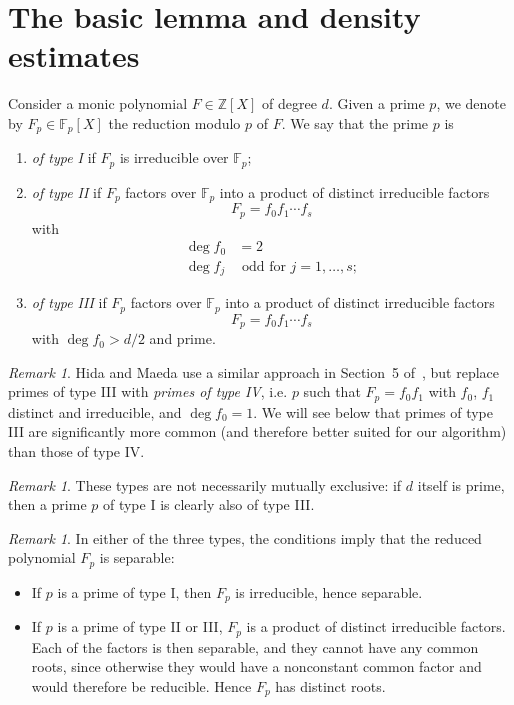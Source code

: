 \documentclass[11pt]{article}
\theoremstyle{plain}
\theoremstyle{definition}
\theoremstyle{remark}
\newtheorem{remark}[theorem]{Remark}
\numberwithin{equation}{section}
\newcommand{\ZZ}{\mathbb{Z}}
\newcommand{\FF}{\mathbb{F}}
\begin{document}
\section{The basic lemma and density estimates}
\label{sect:density}

Consider a monic polynomial $F\in\ZZ[X]$ of degree $d$.
Given a prime $p$, we denote by
$F_p\in\FF_p[X]$ the reduction modulo $p$ of $F$.  We say that the prime
$p$ is
\begin{enumerate}
  \item \emph{of type I} if $F_p$ is irreducible over $\FF_p$;
  \item \emph{of type II} if $F_p$ factors over $\FF_p$ into a product of
    distinct irreducible factors
    \begin{equation*}
      F_p=f_0f_1\cdots f_s
    \end{equation*}
    with
    \begin{align*}
      \deg f_0 &= 2\\
      \deg f_j &\text{ odd for }j=1,\ldots,s;
    \end{align*}
  \item \emph{of type III} if $F_p$ factors over $\FF_p$ into a product of
    distinct irreducible factors
    \begin{equation*}
      F_p=f_0f_1\cdots f_s
    \end{equation*}
    with $\deg f_0>d/2$ and prime.
\end{enumerate}

\begin{remark}\label{rmk:type4}
  Hida and Maeda use a similar approach in Section~5 of~\cite{HidaMaeda}, but 
  replace primes of type III with
  \emph{primes of type IV}, i.e. $p$ such that $F_p=f_0f_1$ with $f_0$, $f_1$
  distinct and irreducible, and $\deg f_0=1$.  We will see below that primes
  of type III are significantly more common (and therefore better suited for
  our algorithm) than those of type IV.
\end{remark}

\begin{remark}
These types are not necessarily mutually exclusive: if $d$ itself is
prime, then a prime $p$ of type I is clearly also of type III.
\end{remark}

\begin{remark}
In either of the three types, the conditions imply that the reduced polynomial
$F_p$ is separable:
\begin{itemize}
  \item If $p$ is a prime of type I, then $F_p$ is irreducible, hence
    separable.
  \item If $p$ is a prime of type II or III, $F_p$ is a product of distinct
    irreducible factors.  Each of the factors is then separable, and they 
    cannot have any common roots, since otherwise they would have a
    nonconstant common factor and would therefore be reducible.  Hence $F_p$
    has distinct roots.
\end{itemize}
\end{remark}
\end{document}
